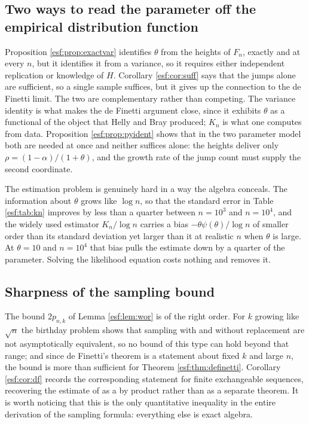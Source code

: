 \subsection{Two ways to read the parameter off the empirical distribution function}

Proposition \ref{esf:prop:exactvar} identifies $\theta$ from the heights of $F_n$, exactly
and at every $n$, but it identifies it from a variance, so it requires either
independent replication or knowledge of $H$. Corollary \ref{esf:cor:suff} says that the
jumps alone are sufficient, so a single sample suffices, but it gives up the
connection to the de Finetti limit. The two are complementary rather than competing.
The variance identity is what makes the de Finetti argument close, since it exhibits
$\theta$ as a functional of the object that Helly and Bray produced; $K_n$ is what one
computes from data. Proposition \ref{esf:prop:pyident} shows that in the two parameter
model both are needed at once and neither suffices alone: the heights deliver only
$\rho = (1-\alpha)/(1+\theta)$, and the growth rate of the jump count must supply the
second coordinate.

The estimation problem is genuinely hard in a way the algebra conceals. The
information about $\theta$ grows like $\log n$, so that the standard error in Table
\ref{esf:tab:kn} improves by less than a quarter between $n = 10^{3}$ and $n = 10^{4}$,
and the widely used estimator $K_n/\log n$ carries a bias $-\theta \psi(\theta)/\log n$
of smaller order than its standard deviation yet larger than it at realistic $n$ when $\theta$ is large. At $\theta = 10$ and $n = 10^{4}$ that
bias pulls the estimate down by a quarter of the parameter. Solving the likelihood equation costs nothing and
removes it.

\subsection{Sharpness of the sampling bound}

The bound $2 p_{n,k}$ of Lemma \ref{esf:lem:wor} is of the right order. For $k$ growing
like $\sqrt{n}$ the birthday problem shows that sampling with and without replacement
are not asymptotically equivalent, so no bound of this type can hold beyond that
range; and since de Finetti's theorem is a statement about fixed $k$ and large $n$,
the bound is more than sufficient for Theorem \ref{esf:thm:definetti}. Corollary
\ref{esf:cor:df} records the corresponding statement for finite exchangeable sequences,
recovering the estimate of \citet{esf:diaconis1980} as a by product rather than as
a separate theorem. It is worth noticing that this is the only quantitative inequality
in the entire derivation of the sampling formula: everything else is exact algebra.

